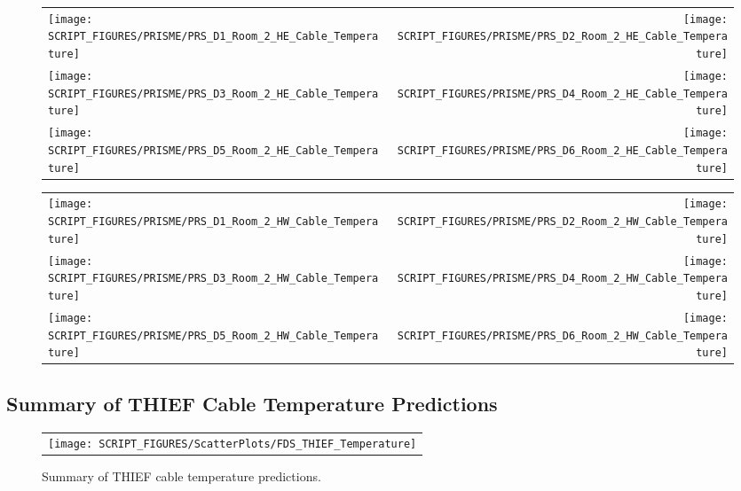 \begin{figure}[p]
\begin{tabular*}{\textwidth}{l@{\extracolsep{\fill}}r}
\texttt{[image: SCRIPT\_FIGURES/PRISME/PRS\_D1\_Room\_2\_HE\_Cable\_Temperature]} &
\texttt{[image: SCRIPT\_FIGURES/PRISME/PRS\_D2\_Room\_2\_HE\_Cable\_Temperature]} \\
\texttt{[image: SCRIPT\_FIGURES/PRISME/PRS\_D3\_Room\_2\_HE\_Cable\_Temperature]} &
\texttt{[image: SCRIPT\_FIGURES/PRISME/PRS\_D4\_Room\_2\_HE\_Cable\_Temperature]} \\
\texttt{[image: SCRIPT\_FIGURES/PRISME/PRS\_D5\_Room\_2\_HE\_Cable\_Temperature]} &
\texttt{[image: SCRIPT\_FIGURES/PRISME/PRS\_D6\_Room\_2\_HE\_Cable\_Temperature]}
\end{tabular*}
\label{PRISME_HE_Cable_Room_2}
\end{figure}

\begin{figure}[p]
\begin{tabular*}{\textwidth}{l@{\extracolsep{\fill}}r}
\texttt{[image: SCRIPT\_FIGURES/PRISME/PRS\_D1\_Room\_2\_HW\_Cable\_Temperature]} &
\texttt{[image: SCRIPT\_FIGURES/PRISME/PRS\_D2\_Room\_2\_HW\_Cable\_Temperature]} \\
\texttt{[image: SCRIPT\_FIGURES/PRISME/PRS\_D3\_Room\_2\_HW\_Cable\_Temperature]} &
\texttt{[image: SCRIPT\_FIGURES/PRISME/PRS\_D4\_Room\_2\_HW\_Cable\_Temperature]} \\
\texttt{[image: SCRIPT\_FIGURES/PRISME/PRS\_D5\_Room\_2\_HW\_Cable\_Temperature]} &
\texttt{[image: SCRIPT\_FIGURES/PRISME/PRS\_D6\_Room\_2\_HW\_Cable\_Temperature]}
\end{tabular*}
\label{PRISME_HW_Cable_Room_2}
\end{figure}



\clearpage

\subsection{Summary of THIEF Cable Temperature Predictions}
\label{THIEF Temperature}


\begin{figure}[h!]
\begin{center}
\begin{tabular}{c}
\texttt{[image: SCRIPT\_FIGURES/ScatterPlots/FDS\_THIEF\_Temperature]}
\end{tabular}
\end{center}
\caption[Summary of THIEF cable temperature predictions]
{Summary of THIEF cable temperature predictions.}
\end{figure}

